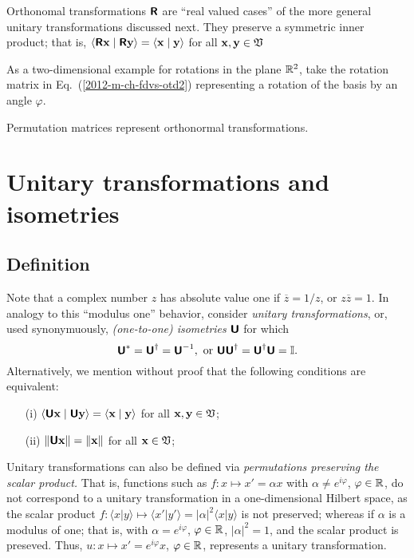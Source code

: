 Orthonomal transformations $\textsf{\textbf{R}}$ are ``real valued cases'' of the more general unitary transformations discussed next.
They preserve a symmetric inner product; that is,
$\langle \textsf{\textbf{R}}{\bf x}\mid \textsf{\textbf{R}}{\bf y} \rangle
=
\langle {\bf x}\mid {\bf y} \rangle$ for all ${\bf x} ,{\bf y} \in {\frak V}$


{\color{blue}
\bexample
As a  two-dimensional  example for rotations in the plane ${\Bbb R}^2$,
take the rotation matrix in Eq.~(\ref{2012-m-ch-fdvs-otd2})
representing a rotation of the basis by an angle $\varphi$.

Permutation matrices represent orthonormal transformations.
\eexample
}

\section{Unitary transformations and isometries}

\subsection {Definition}
Note that a complex number $z$ has absolute value one if $\overline{z}=1/z$, or $z\overline{z}=1$.
In analogy to this ``modulus one'' behavior,
consider {\em unitary transformations}, or, used synonymuously, {\em (one-to-one) isometries}
$\textsf{\textbf{U}}$ for which
\begin{equation}
\textsf{\textbf{U}}^*= \textsf{\textbf{U}}^\dagger =\textsf{\textbf{U}}^{-1},
\textrm{ or } \textsf{\textbf{U}}\textsf{\textbf{U}}^\dagger =\textsf{\textbf{U}}^\dagger \textsf{\textbf{U}}={\Bbb I}.
\end{equation}
Alternatively, we mention without proof that the following conditions are equivalent:
\begin{itemize}
\item[(i)]
$\langle \textsf{\textbf{U}}{\bf x}\mid \textsf{\textbf{U}}{\bf y} \rangle
=
\langle {\bf x}\mid {\bf y} \rangle$ for all ${\bf x} ,{\bf y} \in {\frak V}$;
\item[(ii)]
$\| \textsf{\textbf{U}}{\bf x}\|
=
\|{\bf x}\|$ for all ${\bf x}  \in {\frak V}$;
\end{itemize}

Unitary transformations can also be defined via {\em permutations preserving the scalar product.}
That is, functions such as
$f: x \mapsto x' =\alpha x$ with $\alpha \neq e^{i\varphi}$, $\varphi \in {\Bbb R}$,
do not correspond to a  unitary transformation in a one-dimensional Hilbert space, as
the scalar product $f:
\langle x \vert y \rangle
\mapsto
\langle x'\vert y'\rangle = \vert \alpha \vert^2 \langle x\vert y\rangle$
is not preserved; whereas if $\alpha$ is a modulus of one; that is,
with $\alpha = e^{i\varphi}$, $\varphi \in {\Bbb R}$,
$\vert \alpha \vert^2=1$, and the scalar product is preseved.
Thus, $u: x \mapsto x' =e^{i\varphi} x$, $\varphi \in {\Bbb R}$,
represents a unitary transformation.


